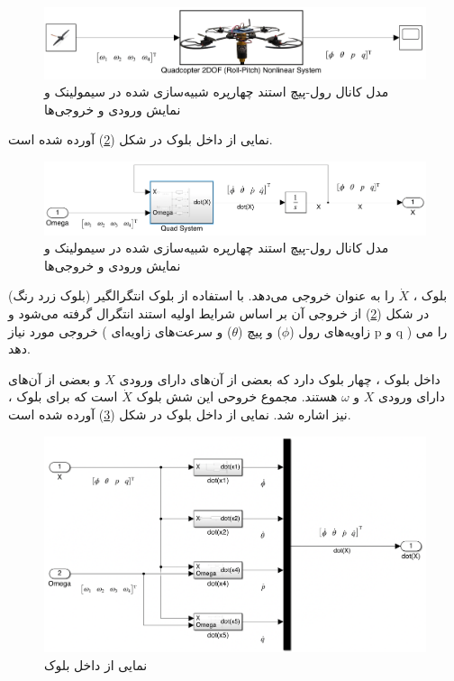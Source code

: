 \begin{figure}[H]
	\includegraphics[width=16cm]{../../Figures/QuadSimulation/roll-pitch_Stand_Model.png}
	\centering
	\vspace*{-15mm}
	\caption{مدل کانال رول-پیچ استند چهارپره شبیه‌سازی شده در سیمولینک و نمایش ورودی و خروجی‌ها}
	\label{roll-pitch_quadsimulink}
\end{figure}
نمایی از داخل بلوک
در شکل (\ref{roll-pitch_Quad3DOF}) آورده شده است.
\begin{figure}[H]
	\includegraphics[width=16cm]{../../Figures/QuadSimulation/roll-pitch_Integrator.png}
	\centering
	\vspace*{-15mm}
	\caption{مدل کانال رول-پیچ استند چهارپره شبیه‌سازی شده در سیمولینک و نمایش ورودی و خروجی‌ها}
	\label{roll-pitch_Quad3DOF}
\end{figure}
بلوک
،
$\dot X$ را به عنوان خروجی می‌دهد. با استفاده از بلوک انتگرالگیر (بلوک زرد رنگ) در شکل
(\ref{roll-pitch_Quad3DOF})
از خروجی آن بر اساس شرایط اولیه استند انتگرال گرفته می‌شود و خروجی مورد نیاز ( زاویه‌های رول ($\phi$) و  پیچ ($\theta$) و سرعت‌های زاویه‌ای‌
p
و
q )
را می دهد.

داخل بلوک
،
چهار بلوک دارد که بعضی از آن‌های دارای ورودی $X$ و بعضی از آن‌های دارای ورودی $X$ و $\omega$ هستند. مجموع خروحی این شش بلوک $\dot X$ است که برای بلوک
،
نیز اشاره شد.
نمایی از داخل بلوک
در شکل (\ref{roll-pitch_all-six}) آورده شده است.
\begin{figure}[H]
	\includegraphics[width=16cm]{../../Figures/QuadSimulation/roll-pitch_all-six.png}
	\centering
	\caption{نمایی از داخل بلوک }
	\label{roll-pitch_all-six}
\end{figure}